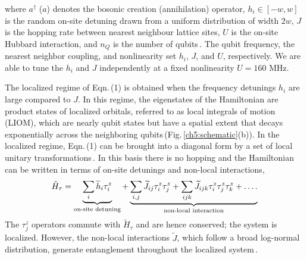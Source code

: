 \noindent
where $a^{\dagger}$ ($a$) denotes the bosonic creation (annihilation) operator, $h_i\in \left[ -w, w \right]$ is the random on-site detuning drawn from a uniform distribution of width $2w$, $J$ is the hopping rate between nearest neighbour lattice sites, $U$ is the on-site Hubbard interaction, and $n_Q$ is the number of qubits\,\cite{supplement}. The qubit frequency, the nearest neighbor coupling, and nonlinearity set $h_i$, $J$, and $U$, respectively. We are able to tune the $h_i$ and $J$ independently at a fixed nonlinearity $U=160$ MHz.

The localized regime of Eqn.\,(1) is obtained when the frequency detunings $h_i$ are large compared to $J$. In this regime, the eigenstates of the Hamiltonian are product states of localized orbitals, referred to as local integrals of motion (LIOM), which are nearly qubit states but have a spatial extent that decays exponentially across the neighboring qubits\,(Fig.\,\ref{ch5:schematic}(b)). In the localized regime, Eqn.\,(1) can be brought into a diagonal form by a set of local unitary transformations\,\cite{Serbyn2013, Huse2014}. In this basis there is no hopping and the Hamiltonian can be written in terms of on-site detunings and non-local interactions,
\vspace{10pt}
\begin{equation} %
\tilde{H}_{\tau} = \underbrace{\sum_i \widetilde{h}_i \tau^z_i}_{\text{on-site detuning}} + \underbrace{ \sum_{i,j} \widetilde{J}_{ij}\tau^z_i\tau^z_j + \sum_{ijk} \widetilde{J}_{ijk}\tau^z_i\tau^z_j\tau^z_k + \mathellipsis.}_{\text{non-local interaction}}%
\end{equation}
\noindent
The $\tau^z_j$ operators commute with $\tilde H_{\tau}$ and are hence conserved; the system is localized. However, the non-local interactions $\widetilde{J}$, which follow a broad log-normal distribution, generate entanglement throughout the localized system\,\cite{Varma2019}.

